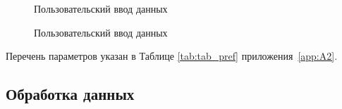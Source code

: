 \begin{figure}[ht]
    \caption{Пользовательский ввод данных}\label{fig:ui-5}
\end{figure}

\begin{figure}[ht]
    \caption{Пользовательский ввод данных}\label{fig:ui-6}
\end{figure}


Перечень параметров указан в Таблице \cref{tab:tab_pref} приложения~\cref{app:A2}.

\subsection{Обработка данных}\label{subsec:ch3/sect3/sub2}

